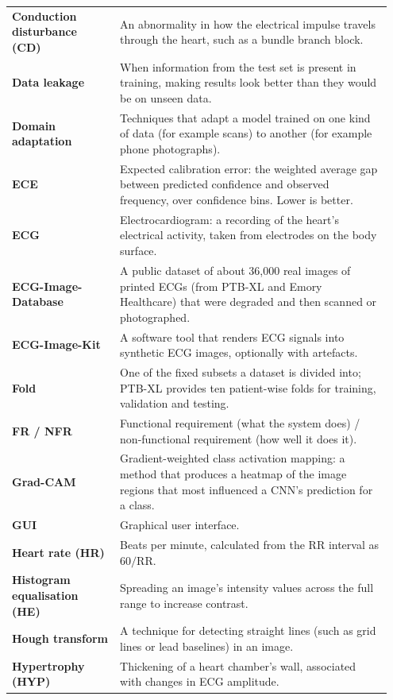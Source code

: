 \documentclass[12pt,nonacm,acmlarge,titlepage,screen]{acmart}
\begin{document}
\begin{longtable}{@{}>{\raggedright\arraybackslash}P{0.27\linewidth} P{0.68\linewidth}@{}}
  \textbf{Conduction disturbance (CD)} & An abnormality in how the electrical impulse travels through the heart, such as a bundle branch block. \\
  \textbf{Data leakage} & When information from the test set is present in training, making results look better than they would be on unseen data. \\
  \textbf{Domain adaptation} & Techniques that adapt a model trained on one kind of data (for example scans) to another (for example phone photographs). \\
  \textbf{ECE} & Expected calibration error: the weighted average gap between predicted confidence and observed frequency, over confidence bins. Lower is better. \\
  \textbf{ECG} & Electrocardiogram: a recording of the heart's electrical activity, taken from electrodes on the body surface. \\
  \textbf{ECG-Image-Database} & A public dataset of about 36,000 real images of printed ECGs (from PTB-XL and Emory Healthcare) that were degraded and then scanned or photographed. \\
  \textbf{ECG-Image-Kit} & A software tool that renders ECG signals into synthetic ECG images, optionally with artefacts. \\
  \textbf{Fold} & One of the fixed subsets a dataset is divided into; PTB-XL provides ten patient-wise folds for training, validation and testing. \\
  \textbf{FR / NFR} & Functional requirement (what the system does) / non-functional requirement (how well it does it). \\
  \textbf{Grad-CAM} & Gradient-weighted class activation mapping: a method that produces a heatmap of the image regions that most influenced a CNN's prediction for a class. \\
  \textbf{GUI} & Graphical user interface. \\
  \textbf{Heart rate (HR)} & Beats per minute, calculated from the RR interval as $60/\mathrm{RR}$. \\
  \textbf{Histogram equalisation (HE)} & Spreading an image's intensity values across the full range to increase contrast. \\
  \textbf{Hough transform} & A technique for detecting straight lines (such as grid lines or lead baselines) in an image. \\
  \textbf{Hypertrophy (HYP)} & Thickening of a heart chamber's wall, associated with changes in ECG amplitude. \\

\end{longtable}
\end{document}
